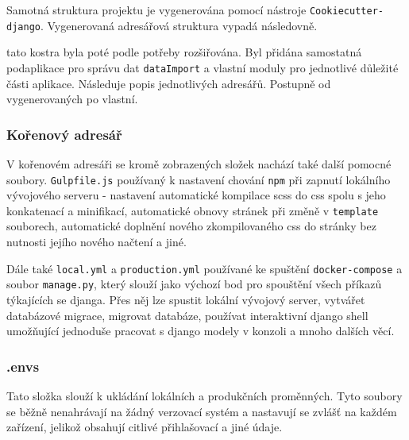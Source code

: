 \par Samotná struktura projektu je vygenerována pomocí nástroje \texttt{Cookiecutter-django}. Vygenerovaná adresářová struktura vypadá následovně.\\



\begin{minipage}[t]{.5\textwidth}
\end{minipage}
\begin{minipage}[t]{.5\textwidth}
\end{minipage}

\vspace{0.5cm}
tato kostra byla poté podle potřeby rozšiřována. Byl přidána samostatná podaplikace pro správu dat \texttt{dataImport} a vlastní moduly pro jednotlivé důležité části aplikace. Následuje popis jednotlivých adresářů. Postupně od vygenerovaných po vlastní.

\subsubsection{Kořenový adresář}
V kořenovém adresáři se kromě zobrazených složek nachází také další pomocné soubory. \texttt{Gulpfile.js} používaný k nastavení chování \texttt{npm} při zapnutí lokálního vývojového serveru - nastavení automatické kompilace scss do css spolu s jeho konkatenací a minifikací, automatické obnovy stránek při změně v \texttt{template} souborech, automatické doplnění nového zkompilovaného css do stránky bez nutnosti jejího nového načtení a jiné.
\par Dále také \texttt{local.yml} a \texttt{production.yml} používané ke spuštění \texttt{docker-compose} a soubor \texttt{manage.py}, který slouží jako výchozí bod pro spouštění všech příkazů týkajících se djanga. Přes něj lze spustit lokální vývojový server, vytvářet databázové migrace, migrovat databáze, používat interaktivní django shell umožňující jednoduše pracovat s django modely v konzoli a mnoho dalších věcí. 

\subsubsection{.envs}
Tato složka slouží k ukládání lokálních a produkčních proměnných. Tyto soubory se běžně nenahrávají na žádný verzovací systém a nastavují se zvlášť na každém zařízení, jelikož obsahují citlivé přihlašovací a jiné údaje.

